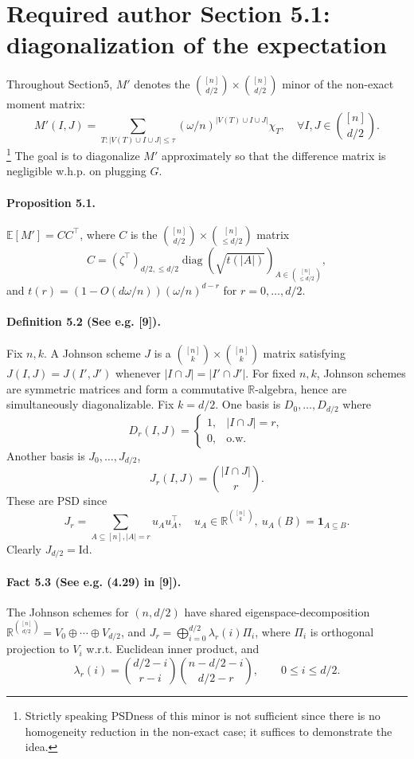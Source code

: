 \section*{Required author Section 5.1: diagonalization of the expectation}
Throughout Section5, $M'$ denotes the $\binom{[n]}{d/2}\times\binom{[n]}{d/2}$ minor of the non-exact moment matrix:
\[M'(I,J)=\sum_{T:|V(T)\cup I\cup J|\le\tau}(\omega/n)^{|V(T)\cup I\cup J|}\chi_T,\quad\forall I,J\in\binom{[n]}{d/2}.\tag{5.1}\]
\footnote{Strictly speaking PSDness of this minor is not sufficient since there is no homogeneity reduction in the non-exact case; it suffices to demonstrate the idea.} The goal is to diagonalize $M'$ approximately so that the difference matrix is negligible w.h.p. on plugging $G$.
\paragraph{Proposition 5.1.} $\mathbb E[M']=CC^\top$, where $C$ is the $\binom{[n]}{d/2}\times\binom{[n]}{\le d/2}$ matrix
\[C=(\zeta^\top)_{d/2,\le d/2}\operatorname{diag}(\sqrt{t(|A|)})_{A\in\binom{[n]}{\le d/2}},\tag{5.2}\]
and $t(r)=(1-O(d\omega/n))(\omega/n)^{d-r}$ for $r=0,\ldots,d/2$.
\paragraph{Definition 5.2 (See e.g. [9]).} Fix $n,k$. A Johnson scheme $J$ is a $\binom{[n]}k\times\binom{[n]}k$ matrix satisfying $J(I,J)=J(I',J')$ whenever $|I\cap J|=|I'\cap J'|$. For fixed $n,k$, Johnson schemes are symmetric matrices and form a commutative $\mathbb R$-algebra, hence are simultaneously diagonalizable. Fix $k=d/2$. One basis is $D_0,\ldots,D_{d/2}$ where
\[D_r(I,J)=\begin{cases}1,&|I\cap J|=r,\\0,&\text{o.w.}\end{cases}\tag{5.3}\]
Another basis is $J_0,\ldots,J_{d/2}$,
\[J_r(I,J)=\binom{|I\cap J|}r.\tag{5.4}\]
These are PSD since
\[J_r=\sum_{A\subseteq[n],|A|=r}u_Au_A^\top,\quad u_A\in\mathbb R^{\binom{[n]}k},\ u_A(B)=\mathbf1_{A\subseteq B}.\tag{5.5}\]
Clearly $J_{d/2}=\mathrm{Id}$.
\paragraph{Fact 5.3 (See e.g. (4.29) in [9]).} The Johnson schemes for $(n,d/2)$ have shared eigenspace-decomposition $\mathbb R^{\binom{[n]}{d/2}}=V_0\oplus\cdots\oplus V_{d/2}$, and $J_r=\bigoplus_{i=0}^{d/2}\lambda_r(i)\Pi_i$, where $\Pi_i$ is orthogonal projection to $V_i$ w.r.t. Euclidean inner product, and
\[\lambda_r(i)=\binom{d/2-i}{r-i}\binom{n-d/2-i}{d/2-r},\qquad0\le i\le d/2.\]
